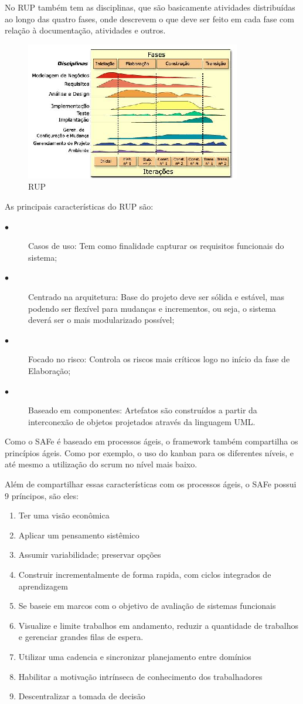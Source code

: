 No RUP também tem as disciplinas, que são basicamente atividades distribuídas ao longo das quatro fases, onde descrevem o que deve ser feito em cada fase com relação à documentação, atividades e outros.
 \begin{figure}[!htpb]
	\centering
	\includegraphics[scale=2.0]{figuras/abordagem/Fases_RUP}
	\caption{RUP}
\end{figure}
As principais características do RUP são:
\begin{description}
		 \item[$\bullet$] Casos de uso: Tem como finalidade capturar os requisitos funcionais do sistema;
         \item[$\bullet$] Centrado na arquitetura: Base do projeto deve ser sólida e estável, mas podendo ser flexível para mudanças e incrementos, ou seja, o sistema deverá ser o mais modularizado possível;
         \item[$\bullet$] Focado no risco: Controla os riscos mais críticos logo no início da fase de Elaboração;
         \item[$\bullet$] Baseado em componentes: Artefatos são construídos a partir da interconexão de objetos projetados através da linguagem UML.
\end{description}

Como o SAFe é baseado em processos ágeis, o framework também compartilha os princípios ágeis. Como por exemplo, o uso do kanban para os diferentes níveis, e até mesmo a utilização do scrum no nível mais baixo.

Além de compartilhar essas características com os processos ágeis, o SAFe possui 9 príncipos, são eles:
\begin{enumerate}
\item Ter uma visão econômica
\item Aplicar um pensamento sistêmico
\item Assumir variabilidade; preservar opções
\item Construir incrementalmente de forma rapida, com ciclos integrados de aprendizagem
\item Se baseie em marcos com o objetivo de avaliação de sistemas funcionais
\item Visualize e limite trabalhos em andamento, reduzir a quantidade de trabalhos e gerenciar grandes filas de espera.
\item Utilizar uma cadencia e sincronizar planejamento entre domínios
\item Habilitar a motivação intrínseca de conhecimento dos trabalhadores
\item Descentralizar a tomada de decisão
\end{enumerate}


